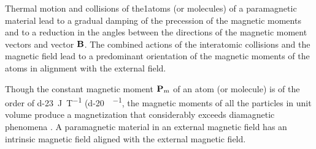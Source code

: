 Thermal motion and collisions of the1atoms (or molecules) of a paramagnetic material lead to a gradual damping of the precession of the magnetic moments and to a reduction in the angles between the directions of the magnetic moment vectors and vector $\vb{B}$. The combined actions of the interatomic collisions and the magnetic field lead to a predominant orientation of the magnetic moments of the atoms in alignment with the external field. 

Though the constant magnetic moment $\vb{P}_{m}$ of an atom (or molecule) is of the order of \SI{d-23}{\joule\per\tesla} (\SI{d-20}{\erg\per\gauss}, the magnetic moments of all the particles in unit volume produce a magnetization that considerably exceeds diamagnetic phenomena . A paramagnetic material in an external magnetic field has an intrinsic magnetic field aligned with the external magnetic field.

